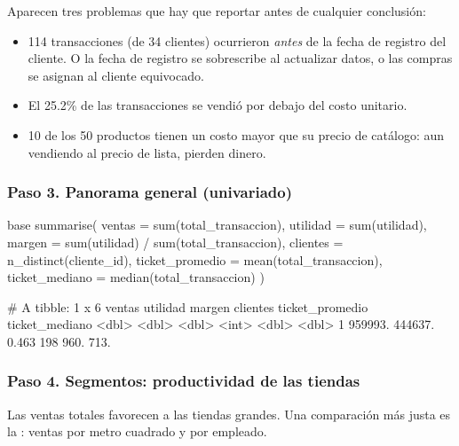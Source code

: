 Aparecen tres problemas que hay que reportar antes de cualquier conclusión:
\begin{itemize}
  \item 114 transacciones (de 34 clientes) ocurrieron \emph{antes} de la
        fecha de registro del cliente. O la fecha de registro se sobrescribe
        al actualizar datos, o las compras se asignan al cliente equivocado.
  \item El 25.2\% de las transacciones se vendió por debajo del costo
        unitario.
  \item 10 de los 50 productos tienen un costo mayor que su precio de
        catálogo: aun vendiendo al precio de lista, pierden dinero.
\end{itemize}

\subsubsection{Paso 3. Panorama general (univariado)}

\begin{rcode}
base %
  summarise(
    ventas          = sum(total_transaccion),
    utilidad        = sum(utilidad),
    margen          = sum(utilidad) / sum(total_transaccion),
    clientes        = n_distinct(cliente_id),
    ticket_promedio = mean(total_transaccion),
    ticket_mediano  = median(total_transaccion)
  )
\end{rcode}
\begin{rsalida}
# A tibble: 1 x 6
   ventas utilidad margen clientes ticket_promedio ticket_mediano
    <dbl>    <dbl>  <dbl>    <int>           <dbl>          <dbl>
1 959993.  444637.  0.463      198            960.           713.
\end{rsalida}

\subsubsection{Paso 4. Segmentos: productividad de las tiendas}

Las ventas totales favorecen a las tiendas grandes. Una comparación más justa
es la : ventas por metro cuadrado y por empleado.

